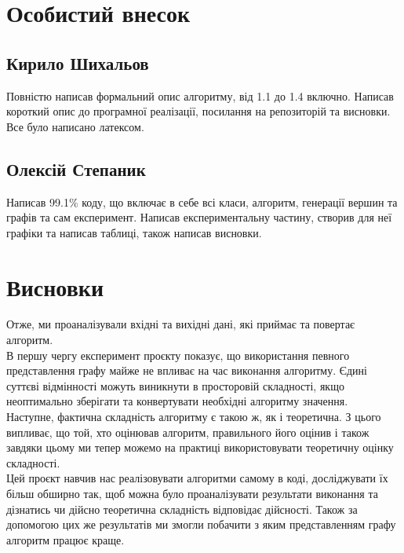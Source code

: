 \documentclass[titlepage, a4paper]{article}
\begin{document}
\section{Особистий внесок}
\subsection*{Кирило Шихальов}
Повністю написав формальний опис алгоритму, від 1.1 до 1.4 включно. Написав короткий опис до програмної реалізації, посилання на репозиторій та висновки. Все було написано латексом.
\subsection*{Олексій Степаник}
Написав 99.1\% коду, що включає в себе всі класи, алгоритм, генерації вершин та графів та сам експеримент. Написав експериментальну частину, створив для неї графіки та написав таблиці, також написав висновки.
\section{Висновки}

Отже, ми проаналізували вхідні та вихідні дані, які приймає та повертає алгоритм.\\
В першу чергу експеримент проєкту показує, що використання певного представлення графу майже не впливає на час виконання алгоритму. Єдині суттєві відмінності можуть виникнути в просторовій складності, якщо неоптимально зберігати та конвертувати необхідні алгоритму значення. \\

Наступне, фактична складність алгоритму є такою ж, як і теоретична. З цього випливає, що той, хто оцінював алгоритм, правильного його оцінив і також завдяки цьому ми тепер можемо на практиці використовувати теоретичну оцінку складності.\\

Цей проєкт навчив нас реалізовувати алгоритми самому в коді, досліджувати їх більш обширно так, щоб можна було проаналізувати результати виконання та дізнатись чи дійсно теоретична складність відповідає дійсності. Також за допомогою цих же результатів ми змогли побачити з яким представленням графу алгоритм працює краще.\\
\end{document}
